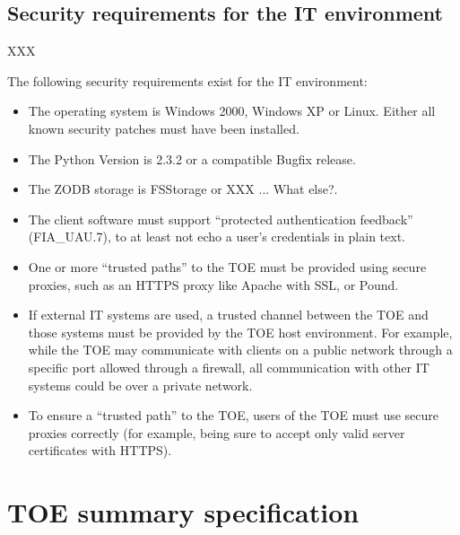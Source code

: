 \documentclass[12pt,english]{scrbook}
\begin{document}



\section{Security requirements for the IT environment}

XXX 

The following security requirements exist for the IT environment:

\begin{itemize}

  \item The operating system is Windows 2000, Windows XP or Linux. Either all
  known security patches must have been installed.

  \item The Python Version is 2.3.2 or a compatible Bugfix release.

  \item The ZODB storage is FSStorage or XXX ... What else?.

  \item The client software must support ``protected authentication feedback''
  (FIA{\_}UAU.7), to at least not echo a user's credentials in plain text.

  \item One or more ``trusted paths'' to the TOE must be provided using secure
  proxies, such as an HTTPS proxy like Apache with SSL, or Pound.

  \item If external IT systems are used, a trusted channel between the TOE and
  those systems must be provided by the TOE host environment.  For example,
  while the TOE may communicate with clients on a public network through a
  specific port allowed through a firewall, all communication with other IT
  systems could be over a private network.

  \item To ensure a ``trusted path'' to the TOE, users of the TOE must use
  secure proxies correctly (for example, being sure to accept only valid
    server certificates with HTTPS).

\end{itemize}

\chapter{TOE summary specification}
\end{document}
